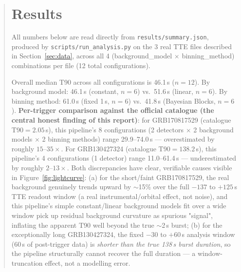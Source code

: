 \documentclass[11pt]{article}
\begin{document}
\begin{abstract}
\section{Results}
\label{sec:results}
All numbers below are read directly from \texttt{results/summary.json},
produced by \texttt{scripts/run\_analysis.py} on the 3 real TTE files
described in Section~\ref{sec:data}, across all 4 (background\_model
$\times$ binning\_method) combinations per file (12 total configurations).

Overall median T90 across all configurations is 46.1\,s ($n=12$). By
background model: 46.1\,s (constant, $n=6$) vs.\ 51.6\,s (linear, $n=6$). By
binning method: 61.0\,s (fixed 1\,s, $n=6$) vs.\ 41.8\,s (Bayesian Blocks,
$n=6$). \textbf{Per-trigger comparison against the official catalogue
(the central honest finding of this report)}: for GRB170817529 (catalogue
T90$=2.05$\,s), this pipeline's 8 configurations (2 detectors $\times$ 2
background models $\times$ 2 binning methods) range 29.9--74.0\,s ---
overestimated by roughly $15$--$35\times$. For GRB130427324 (catalogue
T90$=138.2$\,s), this pipeline's 4 configurations (1 detector) range
11.0--61.4\,s --- underestimated by roughly $2$--$13\times$. Both
discrepancies have clear, verifiable causes visible in
Figure~\ref{fig:lightcurve}: (a) for the short/faint GRB170817529, the real
background genuinely trends upward by $\sim$15\% over the full $-137$ to
$+125$\,s TTE readout window (a real instrumental/orbital effect, not
noise), and this pipeline's simple constant/linear background models fit
over a wide window pick up residual background curvature as spurious
"signal", inflating the apparent T90 well beyond the true $\sim$2\,s burst;
(b) for the exceptionally long GRB130427324, the fixed $-30$ to $+60$\,s
analysis window (60\,s of post-trigger data) is \emph{shorter than the
true 138\,s burst duration}, so the pipeline structurally cannot recover
the full duration --- a window-truncation effect, not a modelling error.


\end{abstract}
\end{document}
